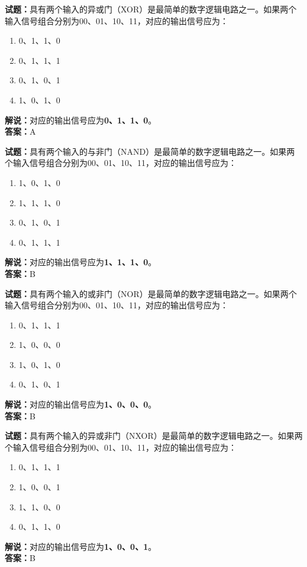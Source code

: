 \documentclass{ctexbook}
\begin{document}
\bigskip


\noindent\textbf{试题：}具有两个输入的异或门（XOR）是最简单的数字逻辑电路之一。如果两个输入信号组合分别为00、01、10、11，对应的输出信号应为：
\begin{enumerate}[leftmargin=3em]
\item 0、1、1、0
\item 0、1、1、1
\item 0、1、0、1
\item 1、0、1、0
\end{enumerate}
\noindent\textbf{解说：}对应的输出信号应为\textbf{0、1、1、0}。\\\noindent\textbf{答案：}A




\bigskip


\noindent\textbf{试题：}具有两个输入的与非门（NAND）是最简单的数字逻辑电路之一。如果两个输入信号组合分别为00、01、10、11，对应的输出信号应为：
\begin{enumerate}[leftmargin=3em]
\item 1、0、1、0
\item 1、1、1、0
\item 0、1、0、1
\item 0、1、1、1
\end{enumerate}
\noindent\textbf{解说：}对应的输出信号应为\textbf{1、1、1、0}。\\\noindent\textbf{答案：}B






\bigskip


\noindent\textbf{试题：}具有两个输入的或非门（NOR）是最简单的数字逻辑电路之一。如果两个输入信号组合分别为00、01、10、11，对应的输出信号应为：
\begin{enumerate}[leftmargin=3em]
\item 0、1、1、1
\item 1、0、0、0
\item 1、0、1、0
\item 0、1、0、1
\end{enumerate}
\noindent\textbf{解说：}对应的输出信号应为\textbf{1、0、0、0}。\\\noindent\textbf{答案：}B





\bigskip


\noindent\textbf{试题：}具有两个输入的异或非门（NXOR）是最简单的数字逻辑电路之一。如果两个输入信号组合分别为00、01、10、11，对应的输出信号应为：
\begin{enumerate}[leftmargin=3em]
\item 0、1、1、1
\item 1、0、0、1
\item 1、1、0、0
\item 0、1、1、0
\end{enumerate}
\noindent\textbf{解说：}对应的输出信号应为\textbf{1、0、0、1}。\\\noindent\textbf{答案：}B
\end{document}
